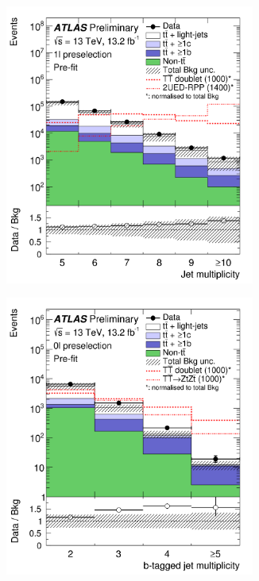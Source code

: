 \begin{figure}[h!]
\begin{subfigure}{0.5\textwidth}
  \centering
  \includegraphics[width=0.9\textwidth]{figures/VLQ/figaux_01a.png}
  \caption{}
  \label{sec:vlq:fig:njetsyst}
\end{subfigure}
\begin{subfigure}{0.5\textwidth}
  \centering
  \includegraphics[width=0.9\textwidth]{figures/VLQ/figaux_02a.png}
  \caption{}
  \label{sec:vlq:fig:nbjetsyst}
\end{subfigure}


\end{figure}
